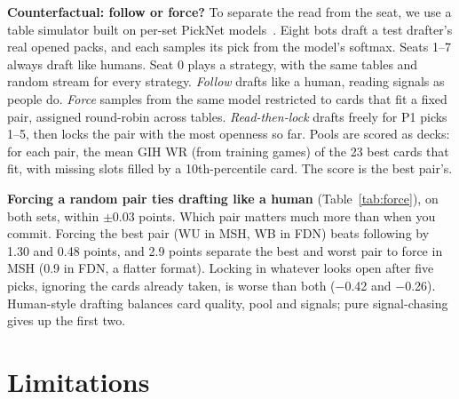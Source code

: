 \documentclass[10pt,letterpaper]{article}
\begin{document}
\textbf{Counterfactual: follow or force?} To separate the read from the seat, we use a table simulator built
on per-set PickNet models~\cite{picknet}. Eight bots draft a test drafter's real opened packs, and each samples
its pick from the model's softmax. Seats 1--7 always draft like humans. Seat 0 plays a strategy, with the same
tables and random stream for every strategy. \emph{Follow} drafts like a human, reading signals as people do.
\emph{Force} samples from the same model restricted to cards that fit a fixed pair, assigned round-robin
across tables. \emph{Read-then-lock} drafts freely for P1 picks 1--5, then locks the pair with the most openness
so far. Pools are scored as decks: for each pair, the mean GIH WR (from training games) of the 23 best cards that
fit, with missing slots filled by a 10th-percentile card. The score is the best pair's.

\textbf{Forcing a random pair ties drafting like a human} (Table~\ref{tab:force}), on both sets, within
$\pm$0.03 points. Which pair matters much more than when you commit. Forcing the best pair (WU in MSH, WB in
FDN) beats following by 1.30 and 0.48 points, and 2.9 points separate the best and worst pair to force in MSH
(0.9 in FDN, a flatter format). Locking in whatever looks open after five picks, ignoring the cards already
taken, is worse than both ($-$0.42 and $-$0.26). Human-style drafting balances card quality, pool and signals;
pure signal-chasing gives up the first two.

\section{Limitations}
\end{document}
